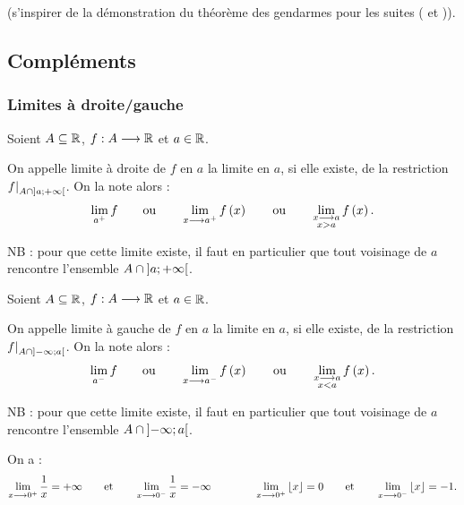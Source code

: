 \begin{dem}
 (s'inspirer de la démonstration du théorème des gendarmes pour les suites ( et )).
\end{dem}

\subsection{Compléments}

\subsubsection{Limites à droite/gauche}

\begin{defi}
Soient \(A\subseteq\mathbb{R}\), \(f:A\longrightarrow\mathbb{R}\) et \(a\in\mathbb{R}\).

On appelle limite à droite de \(f\) en \(a\) la limite en \(a\), si elle existe, de la restriction \(\restr{f}{A\inter\intervee{a}{\pinf}}\). On la note alors : \[\lim_{a^+}f\qquad\text{ou}\qquad\lim_{x\longrightarrow a^+}f\left(x\right)\qquad\text{ou}\qquad\lim_{\substack{x\longrightarrow a \\ x>a}}f\left(x\right).\]

NB : pour que cette limite existe, il faut en particulier que tout voisinage de \(a\) rencontre l'ensemble \(A\cap\left]a;+\infty\right[\).
\end{defi}

\begin{defi}
Soient \(A\subseteq\mathbb{R}\), \(f:A\longrightarrow\mathbb{R}\) et \(a\in\mathbb{R}\).

On appelle limite à gauche de \(f\) en \(a\) la limite en \(a\), si elle existe, de la restriction \(\restr{f}{A\inter\intervee{\minf}{a}}\). On la note alors : \[\lim_{a^-}f\qquad\text{ou}\qquad\lim_{x\longrightarrow a^-}f\left(x\right)\qquad\text{ou}\qquad\lim_{\substack{x\longrightarrow a \\ x<a}}f\left(x\right).\]

NB : pour que cette limite existe, il faut en particulier que tout voisinage de \(a\) rencontre l'ensemble \(A\cap\left]-\infty;a\right[\).
\end{defi}

\begin{ex}
On a : \[\lim_{x\longrightarrow0^+}\dfrac{1}{x}=+\infty\qquad\text{et}\qquad\lim_{x\longrightarrow0^-}\dfrac{1}{x}=-\infty\qquad\qquad\lim_{x\longrightarrow0^+}\left\lfloor x\right\rfloor=0\qquad\text{et}\qquad\lim_{x\longrightarrow0^-}\left\lfloor x\right\rfloor=-1.\]
\end{ex}

